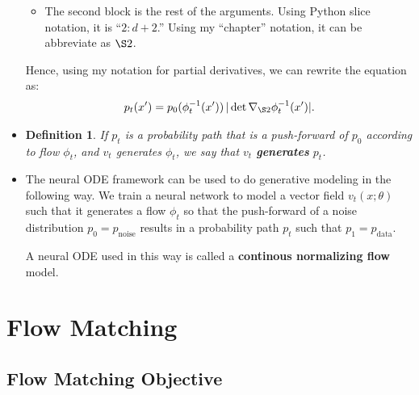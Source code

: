 \documentclass[10pt]{article}
\newtheorem{definition}[lemma]{Definition}
\newcommand{\mrm}[1]{\mathrm{#1}}
\newcommand{\data}{\mathrm{data}}
\begin{document}
\begin{itemize}
\begin{itemize}
    \item The second block is the rest of the arguments. Using Python slice notation, it is ``$2:d+2$.'' Using my ``chapter'' notation, it can be abbreviate as $\S 2$.
  \end{itemize}
  Hence, using my notation for partial derivatives, we can rewrite the equation as:
  \begin{align}
    p_t(x') = p_0(\phi_t^{-1}(x'))\, | \det \nabla_{\S 2} \phi^{-1}_t(x') |. \label{eqn:cnf-prob-xform-my-notation}
  \end{align}  

  \item \begin{definition} 
    If $p_t$ is a probability path that is a push-forward of $p_0$ according to flow $\phi_t$, and $v_t$ generates $\phi_t$, we say that $v_t$ {\bf generates} $p_t$.
  \end{definition}
  
  \item The neural ODE framework can be used to do generative modeling in the following way. We train a neural network to model a vector field $v_t(x;\theta)$ such that it generates a flow $\phi_t$ so that the push-forward of a noise distribution $p_0 = p_{\mrm{noise}}$ results in a probability path $p_t$ such that $p_1 = p_{\data}$.
  
  A neural ODE used in this way is called a {\bf continous normalizing flow} model.
\end{itemize}

\section{Flow Matching}

\subsection{Flow Matching Objective}
\end{document}

